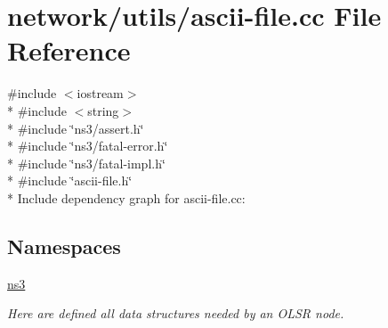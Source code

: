 \hypertarget{ascii-file_8cc}{}\section{network/utils/ascii-\/file.cc File Reference}
\label{ascii-file_8cc}
{\ttfamily \#include $<$iostream$>$}\\*
{\ttfamily \#include $<$string$>$}\\*
{\ttfamily \#include \char`\"{}ns3/assert.\+h\char`\"{}}\\*
{\ttfamily \#include \char`\"{}ns3/fatal-\/error.\+h\char`\"{}}\\*
{\ttfamily \#include \char`\"{}ns3/fatal-\/impl.\+h\char`\"{}}\\*
{\ttfamily \#include \char`\"{}ascii-\/file.\+h\char`\"{}}\\*
Include dependency graph for ascii-\/file.cc\+:
\subsection*{Namespaces}
\begin{DoxyCompactItemize}
\item 
 \hyperlink{namespacens3}{ns3}
\begin{DoxyCompactList}\small\item\em Here are defined all data structures needed by an O\+L\+SR node. \end{DoxyCompactList}\end{DoxyCompactItemize}
